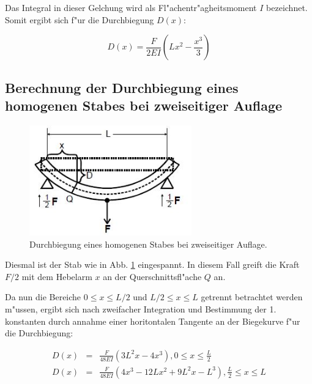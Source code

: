 		Das Integral in dieser Gelchung wird als Fl"achentr"agheitsmoment $I$ bezeichnet. Somit ergibt sich f"ur die Durchbiegung $D(x)$:

		\begin{equation}
			D(x) = \frac{F}{2EI} \left( Lx^2- \frac{x^3}{3} \right) \label{eqn:einseitig}
		\end{equation}

	\subsection{Berechnung der Durchbiegung eines homogenen Stabes bei zweiseitiger Auflage} %
	\label{sub:2}

	\begin{figure}[!h]
		\centering
		\includegraphics[width = 7cm]{img/biegung2.JPG}
		\caption{Durchbiegung eines homogenen Stabes bei zweiseitiger Auflage.}
		\label{fg:biegung2}
	\end{figure}

	Diesmal ist der Stab wie in Abb. \ref{fg:biegung2} eingespannt. In diesem Fall greift die Kraft $F/2$ mit dem Hebelarm $x$ an der Querschnittsfl"ache $Q$ an. 

	Da nun die Bereiche $0 \leq x \leq L/2$ und $L/2 \leq x \leq L$ getrennt betrachtet werden m"ussen, ergibt sich nach zweifacher Integration und Bestimmung der 1. konstanten durch annahme einer horitontalen Tangente an der Biegekurve  f"ur die Durchbiegung:

	\begin{eqnarray}
		D(x) &=& \frac{F}{48EI}(3L^2x-4x^3) , 0 \leq x \leq \frac{L}{2} \\
		D(x) &=& \frac{F}{48EI}(4x^3-12Lx^2+9L^2x-L^3) , \frac{L}{2} \leq x \leq L
	\end{eqnarray}

